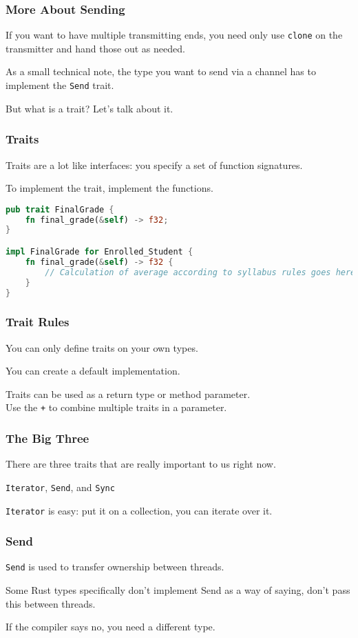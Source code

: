 \begin{frame}
\frametitle{More About Sending}

If you want to have multiple transmitting ends, you need only use \texttt{clone} on the transmitter and hand those out as needed. 


As a small technical note, the type you want to send via a channel has to implement the \texttt{Send} trait.

But what is a trait? Let's talk about it.

\end{frame}


\begin{frame}[fragile]
\frametitle{Traits}

Traits are a lot like interfaces: you specify a set of function signatures.

To implement the trait, implement the functions.

\begin{lstlisting}[language=Rust]
pub trait FinalGrade {
	fn final_grade(&self) -> f32;
}

impl FinalGrade for Enrolled_Student {
    fn final_grade(&self) -> f32 {
        // Calculation of average according to syllabus rules goes here
    }	
}  
\end{lstlisting}

\end{frame}

\begin{frame}
\frametitle{Trait Rules}

You can only define traits on your own types.

You can create a default implementation.

Traits can be used as a return type or method parameter.\\
\quad Use the \texttt{+} to combine multiple traits in a parameter.

\end{frame}


\begin{frame}
\frametitle{The Big Three}

There are three traits that are really important to us right now. 

\texttt{Iterator}, \texttt{Send}, and \texttt{Sync}


\texttt{Iterator} is easy: put it on a collection, you can iterate over it.
\end{frame}


\begin{frame}
\frametitle{Send}

\texttt{Send} is used to transfer ownership between threads.

Some Rust types specifically don't implement Send as a way of saying, don't pass this between threads. 

If the compiler says no, you need a different type.

\end{frame}


